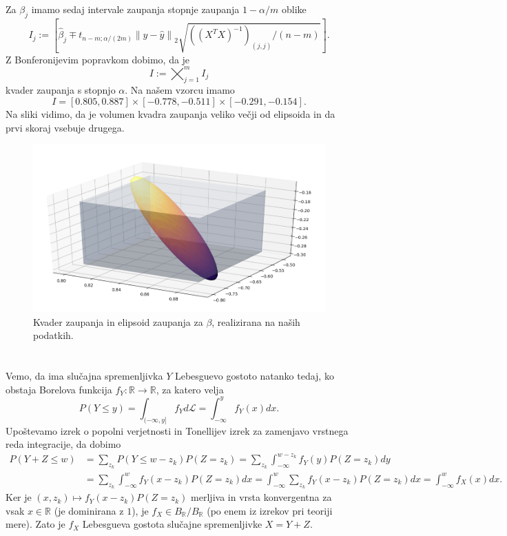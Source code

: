 \documentclass[ letterpaper, titlepage, fleqn]{article}
\newcommand{\R}{\mathbb R}
\newcommand{\LL}{\mathscr L}
\newcommand{\norm}[1]{\left\lVert#1\right\rVert}
\begin{document}
\subsubsection{}
Za $\beta_j$ imamo sedaj intervale zaupanja stopnje zaupanja $1 - \alpha / m$ oblike
$$I_j := \left[\hat{\beta}_j \mp t_{n-m;\alpha/(2m)} \norm{y - \hat{y}}_2 \sqrt{((X^TX)^{-1})_{(j,j)} / (n-m)}\right].$$
Z Bonferonijevim popravkom dobimo, da je
$$I := \bigtimes_{j=1}^m I_j$$
kvader zaupanja s stopnjo $\alpha$. Na našem vzorcu imamo
$$I = [0.805, 0.887] \times [-0.778, -0.511] \times [-0.291, -0.154].$$
Na sliki vidimo, da je volumen kvadra zaupanja veliko večji od elipsoida in da prvi skoraj vsebuje drugega.
\begin{center}
\begin{figure}[h]
\includegraphics[width=16cm]{graphics/ConfidenceElipsoidVsCuboid1.png}
\caption{Kvader zaupanja in elipsoid zaupanja za $\beta$, realizirana na naših podatkih.}
\end{figure}
\end{center}

\section{}
\subsection{}
Vemo, da ima slučajna spremenljivka $Y$ Lebesguevo gostoto natanko tedaj, ko obstaja Borelova funkcija $f_Y \colon \R \to \R$, za katero velja
$$P(Y \leq y) = \int_{(-\infty, y]} f_Y d\LL = \int_{-\infty}^y f_Y(x) dx.$$
Upoštevamo izrek o popolni verjetnosti in Tonellijev izrek za zamenjavo vrstnega reda integracije, da dobimo
\begin{equation*}
\begin{aligned}
P(Y + Z \leq w) &= \sum_{z_k} P(Y \leq w - z_k) P(Z = z_k) = \sum_{z_k} \int_{-\infty}^{w-z_k} f_Y(y) P(Z = z_k) dy \\
&= \sum_{z_k} \int_{-\infty}^w f_Y(x - z_k) P(Z = z_k) dx = \int_{-\infty}^w \sum_{z_k} f_Y(x-z_k) P(Z = z_k) dx = \int_{-\infty}^w f_X(x) dx.
\end{aligned}
\end{equation*}
Ker je $(x,z_k) \mapsto f_Y(x - z_k) P(Z = z_k)$ merljiva in vrsta konvergentna za vsak $x\in\R$ (je dominirana z $1$), je $f_X \in B_\R / B_\R$ (po enem iz izrekov pri teoriji mere). Zato je $f_X$ Lebesgueva gostota slučajne spremenljivke $X = Y + Z$.
\end{document}
